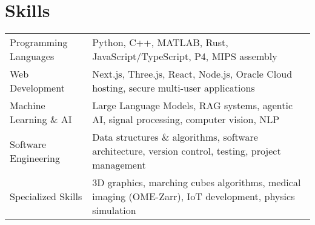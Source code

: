 \documentclass[a4paper,12pt]{article}
\begin{document}
\section{Skills}
\begin{tabularx}{\linewidth}{@{}l X@{}}
Programming Languages &  \normalsize{Python, C++, MATLAB, Rust, JavaScript/TypeScript, P4, MIPS assembly}\\
Web Development &  \normalsize{Next.js, Three.js, React, Node.js, Oracle Cloud hosting, secure multi-user applications}\\
Machine Learning \& AI &  \normalsize{Large Language Models, RAG systems, agentic AI, signal processing, computer vision, NLP}\\
Software Engineering &  \normalsize{Data structures \& algorithms, software architecture, version control, testing, project management}\\
Specialized Skills &  \normalsize{3D graphics, marching cubes algorithms, medical imaging (OME-Zarr), IoT development, physics simulation}\\
\end{tabularx}

\vfill
{}
\end{document}

